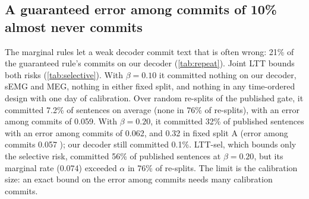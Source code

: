 \subsection{A guaranteed error among commits of 10\% almost never commits}
\label{sec:res-selective}
The marginal rules let a weak decoder commit text that is often wrong: 21\% of the guaranteed rule's commits on our decoder (\cref{tab:repeat}). Joint LTT bounds both risks (\cref{tab:selective}). With $\beta = 0.10$ it committed nothing on our decoder, sEMG and MEG, nothing in either fixed split, and nothing in any time-ordered design with one day of calibration. Over random re-splits of the published gate, it committed 7.2\% of sentences on average (none in 76\% of re-splits), with an error among commits of 0.059. With $\beta = 0.20$, it committed 32\% of published sentences with an error among commits of 0.062, and 0.32 in fixed split A (error among commits 0.057 ); our decoder still committed 0.1\%. LTT-sel, which bounds only the selective risk, committed 56\% of published sentences at $\beta = 0.20$, but its marginal rate (0.074) exceeded $\alpha$ in 76\% of re-splits. The limit is the calibration size: an exact bound on the error among commits needs many calibration commits.

